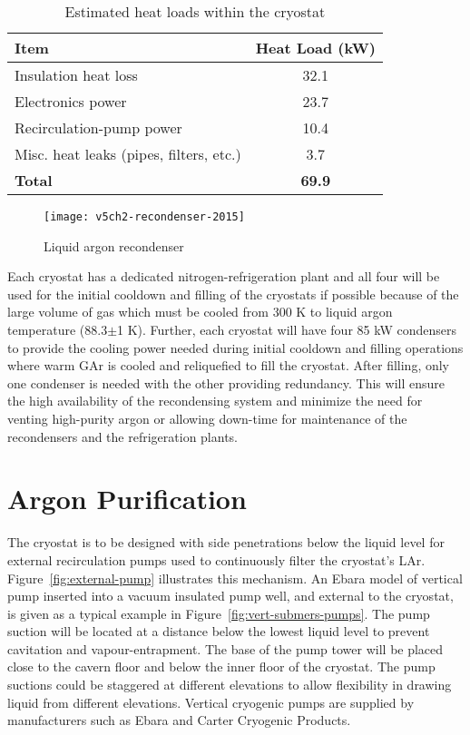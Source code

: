 \begin{table}
\centering
\caption{Estimated heat loads within the cryostat}
\label{table:cryo-heat-loads}
\begin{tabular}[htbp]{|l|c|}
\hline
{\bf Item} & {\bf Heat Load (kW)}\\
\hline\hline
Insulation heat loss & 32.1  \\
\hline
Electronics power & 23.7  \\
\hline
Recirculation-pump power & 10.4 \\
\hline
Misc. heat leaks (pipes, filters, etc.) & 3.7 \\
\hline\hline
{\bf Total} & {\bf 69.9 } \\
\hline
\end{tabular} 
\end{table}

\begin{figure}[htbp]
\centering
\texttt{[image: v5ch2-recondenser-2015]}
\caption{Liquid argon recondenser}
\label{fig:v5ch2-recondenser-sept-2011}
\end{figure}

Each cryostat has a dedicated nitrogen-refrigeration plant 
and all four will be used for the initial cooldown and filling of the 
cryostats if possible because of the large volume of 
gas which must be cooled from 300 K to liquid
argon temperature (88.3$\pm$1 K). Further, each cryostat will
have four 85 kW condensers to 
provide the cooling power needed during initial 
cooldown and filling operations where warm GAr
is cooled and reliquefied to fill the cryostat.
After filling, only one condenser is needed with the
other providing redundancy.
This will ensure the high availability of the recondensing 
system and minimize the need for venting high-purity argon 
or allowing down-time for maintenance of
the recondensers and the refrigeration plants. 

\section{Argon Purification}
\label{subsec:argon-pur}
The cryostat is to be designed with side penetrations below the liquid level 
for external recirculation pumps used to continuously filter the cryostat's 
LAr. Figure~\ref{fig:external-pump} illustrates this mechanism. An Ebara 
model of vertical pump inserted into a vacuum insulated pump well, and 
external to the cryostat, is given 
as a typical example in Figure~\ref{fig:vert-submers-pumps}. The pump suction 
will be located at a distance below the lowest liquid level  
to prevent cavitation and vapour-entrapment. The base of the pump
tower will be placed close to the cavern floor and below the inner
floor of the cryostat. The pump suctions
could be staggered at different elevations to allow flexibility 
in drawing liquid from different 
elevations. Vertical cryogenic pumps are supplied by manufacturers 
such as Ebara and Carter Cryogenic Products. 

